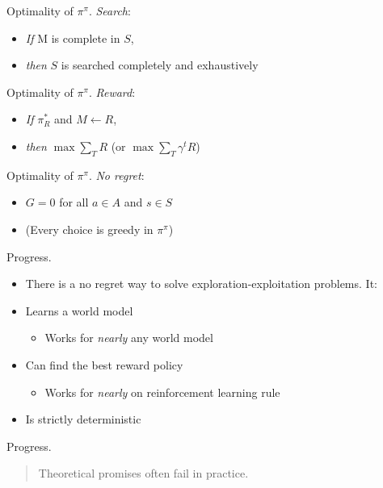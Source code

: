 \documentclass[10pt]{beamer}
\begin{document}
\begin{frame}[fragile]{Optimality of $\pi^\pi$.}
\textit{Search}:
\begin{itemize}
\item \textit{If} M is complete in $S$, 
\item \textit{then} $S$ is searched completely and exhaustively
\end{itemize}
\end{frame}

\begin{frame}[fragile]{Optimality of $\pi^\pi$.}
\textit{Reward}:
\begin{itemize}
    \item \textit{If} $\pi^*_R$ and $M \leftarrow R$,
    \item \textit{then} $\max \sum_T R$ (or $\max \sum_T \gamma^t R$)
\end{itemize}
\end{frame}

\begin{frame}[fragile]{Optimality of $\pi^\pi$.}
\textit{No regret}:
\begin{itemize}
\item $G = 0$ for all $a \in A$ and $s \in S$
\item (Every choice is greedy in $\pi^{\pi}$)
\end{itemize}
\end{frame}

\begin{frame}[fragile]{Progress.}
\begin{itemize}
\item There is a no regret way to solve exploration-exploitation problems. It:
\item Learns a world model
\begin{itemize}
    \item Works for \textit{nearly} any world model
\end{itemize}
\item Can find the best reward policy
\begin{itemize}
    \item Works for \textit{nearly} on reinforcement learning rule
\end{itemize}
\item Is strictly deterministic
\end{itemize}
\end{frame}

\begin{frame}[fragile]{Progress.}
\begin{quote}
    Theoretical promises often fail in practice.
\end{quote}
\end{frame}
\end{document}
